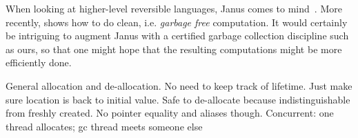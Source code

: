 \documentclass[sigplan,10pt,review,anonymous]{acmart}
\begin{document}
When looking at higher-level reversible languages, Janus
comes to mind~\cite{lutz1982janus}.  More recently, \cite{Yokoyama:2008:PRP}
shows how to do clean, i.e. \emph{garbage free} computation. It
would certainly be intriguing to augment Janus with a certified
garbage collection discipline such as ours, so that one might hope
that the resulting computations might be more efficiently done.

 

General allocation and de-allocation. No need to keep track of
lifetime. Just make sure location is back to initial value. Safe to
de-allocate because indistinguishable from freshly created. No pointer
equality and aliases though. Concurrent: one thread allocates; gc
thread meets someone else


\end{document}

